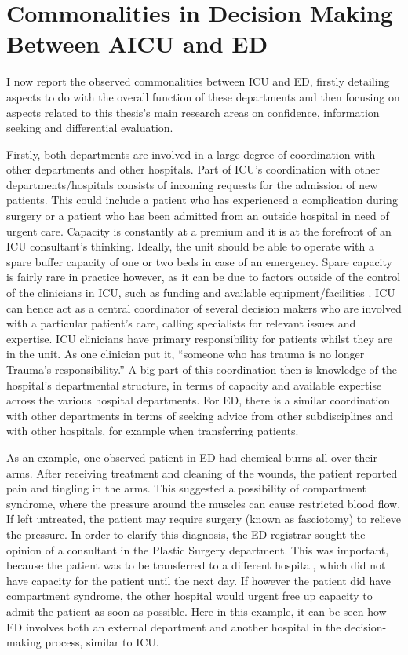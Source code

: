 \documentclass[a4paper, nobind]{templates/ociamthesis}
\begin{document}
\section*{Commonalities in Decision Making Between AICU and ED}\label{commonalities-in-decision-making-between-aicu-and-ed}

I now report the observed commonalities between ICU and ED, firstly detailing aspects to do with the overall function of these departments and then focusing on aspects related to this thesis's main research areas on confidence, information seeking and differential evaluation.

\hfill\break
Firstly, both departments are involved in a large degree of coordination with other departments and other hospitals. Part of ICU's coordination with other departments/hospitals consists of incoming requests for the admission of new patients. This could include a patient who has experienced a complication during surgery or a patient who has been admitted from an outside hospital in need of urgent care. Capacity is constantly at a premium and it is at the forefront of an ICU consultant's thinking. Ideally, the unit should be able to operate with a spare buffer capacity of one or two beds in case of an emergency. Spare capacity is fairly rare in practice however, as it can be due to factors outside of the control of the clinicians in ICU, such as funding and available equipment/facilities \autocite{gooch_icu_2014,murthy_intensive_2015}. ICU can hence act as a central coordinator of several decision makers who are involved with a particular patient's care, calling specialists for relevant issues and expertise. ICU clinicians have primary responsibility for patients whilst they are in the unit. As one clinician put it, ``someone who has trauma is no longer Trauma's responsibility.'' A big part of this coordination then is knowledge of the hospital's departmental structure, in terms of capacity and available expertise across the various hospital departments. For ED, there is a similar coordination with other departments in terms of seeking advice from other subdisciplines and with other hospitals, for example when transferring patients.

\hfill\break
As an example, one observed patient in ED had chemical burns all over their arms. After receiving treatment and cleaning of the wounds, the patient reported pain and tingling in the arms. This suggested a possibility of compartment syndrome, where the pressure around the muscles can cause restricted blood flow. If left untreated, the patient may require surgery (known as fasciotomy) to relieve the pressure. In order to clarify this diagnosis, the ED registrar sought the opinion of a consultant in the Plastic Surgery department. This was important, because the patient was to be transferred to a different hospital, which did not have capacity for the patient until the next day. If however the patient did have compartment syndrome, the other hospital would urgent free up capacity to admit the patient as soon as possible. Here in this example, it can be seen how ED involves both an external department and another hospital in the decision-making process, similar to ICU.
\end{document}
